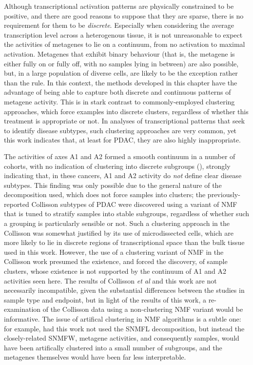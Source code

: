 \documentclass[dissertation.tex]{subfiles}
\begin{document}
Although transcriptional activation patterns are physically constrained to be positive, and there are good reasons to suppose that they are sparse, there is no requirement for them to be \emph{discrete}.  Especially when considering the average transcription level across a heterogenous tissue, it is not unreasonable to expect the activities of metagenes to lie on a continuum, from no activation to maximal activation.  Metagenes that exhibit binary behaviour (that is, the metagene is either fully on or fully off, with no samples lying in between) are also possible, but, in a large population of diverse cells, are likely to be the exception rather than the rule.  In this context, the methods developed in this chapter have the advantage of being able to capture both discrete and continuous patterns of metagene activity.  This is in stark contrast to commonly-employed clustering approaches, which force examples into discrete clusters, regardless of whether this treatment is appropriate or not.  In analyses of transcriptional patterns that seek to identify disease subtypes, such clustering approaches are very common, yet this work indicates that, at least for \gls{PDAC}, they are also highly inappropriate.

The activities of axes A1 and A2 formed a smooth continuum in a number of cohorts, with no indication of clustering into discrete subgroups (), strongly indicating that, in these cancers, A1 and A2 activity do \emph{not} define clear disease subtypes.  This finding was only possible due to the general nature of the decomposition used, which does not force samples into clusters; the previously-reported Collisson subtypes of \gls{PDAC} \cite{Collisson2011} were discovered using a variant of \gls{NMF} that is tuned to stratify samples into stable subgroups, regardless of whether such a grouping is particularly sensible or not.  Such a clustering approach in the Collisson was somewhat justified by its use of microdissected cells, which are more likely to lie in discrete regions of transcriptional space than the bulk tissue used in this work.  However, the use of a clustering variant of \gls{NMF} in the Collisson work presumed the existence, and forced the discovery, of sample clusters, whose existence is not supported by the continuum of A1 and A2 activities seen here.  The results of Collisson \emph{et al} and this work are not necessarily incompatible, given the substantial differences between the studies in sample type and endpoint, but in light of the results of this work, a re-examination of the Collisson data using a non-clustering \gls{NMF} variant would be informative.  The issue of artifical clustering in \gls{NMF} algorithms is a subtle one: for example, had this work not used the \gls{SNMFL} decomposition, but instead the closely-related \gls{SNMFW}, metagene activities, and consequently samples, would have been artifically clustered into a small number of subgroups, and the metagenes themselves would have been far less interpretable.
\end{document}
